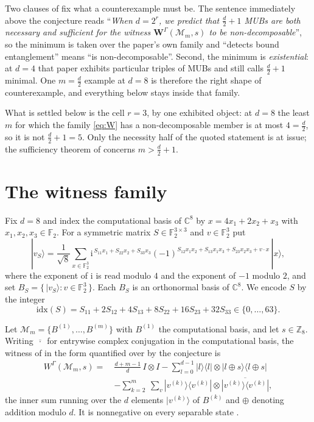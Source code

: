 \documentclass[11pt]{amsart}
\newcommand{\CC}{\mathbb C}
\newcommand{\FF}{\mathbb F_2}
\newcommand{\W}{W^{\Gamma}}
\newcommand{\M}{\mathcal M}
\newcommand{\ii}{\mathrm i}
\begin{document}
Two clauses of \cite{BBCHM} fix what a counterexample must be. The sentence
immediately above the conjecture reads ``\emph{When $d=2^r$, we predict that
$\frac d2+1$ MUBs are both necessary and sufficient for the witness
$\mathbf W^{\Gamma}(\mathcal M_m,s)$ to be non-decomposable}'', so the minimum is taken
over the paper's own family and ``detects bound entanglement'' means ``is
non-decomposable''. Second, the minimum is \emph{existential}: at $d=4$ that paper
exhibits particular triples of MUBs and still calls $\frac d2+1$ minimal. One
$m=\frac d2$ example at $d=8$ is therefore the right shape of counterexample, and
everything below stays inside that family.

What is settled below is the cell $r=3$, by one exhibited object: at $d=8$ the least
$m$ for which the family \eqref{eq:W} has a non-decomposable member is at most
$4=\frac d2$, so it is not $\frac d2+1=5$. Only the necessity half of the quoted
statement is at issue; the sufficiency theorem of \cite{BBCHM} concerns
$m>\frac d2+1$.

\section{The witness family}

Fix $d=8$ and index the computational basis of $\CC^8$ by
$x=4x_1+2x_2+x_3$ with $x_1,x_2,x_3\in\FF$. For a symmetric matrix
$S\in\FF^{3\times3}$ and $v\in\FF^3$ put
\begin{equation}\label{eq:vS}
  |v_S\rangle
  =\frac1{\sqrt8}\sum_{x\in\FF^3}
   \ii^{\,S_{11}x_1+S_{22}x_2+S_{33}x_3}
   (-1)^{S_{12}x_1x_2+S_{13}x_1x_3+S_{23}x_2x_3+v\cdot x}\,|x\rangle ,
\end{equation}
where the exponent of $\ii$ is read modulo $4$ and the exponent of $-1$ modulo $2$,
and set $B_S=\{\,|v_S\rangle : v\in\FF^3\,\}$. Each $B_S$ is an orthonormal basis of
$\CC^8$. We encode $S$ by the integer
\begin{equation}\label{eq:idx}
  \mathrm{idx}(S)=S_{11}+2S_{12}+4S_{13}+8S_{22}+16S_{23}+32S_{33}\in\{0,\dots,63\}.
\end{equation}

Let $\M_m=\{B^{(1)},\dots,B^{(m)}\}$ with $B^{(1)}$ the computational basis, and let
$s\in\mathbb Z_8$. Writing $\overline{\,\cdot\,}$ for entrywise complex conjugation in
the computational basis, the witness of \cite{Spengler} in the form quantified over by
the conjecture is
\begin{equation}\label{eq:W}
\begin{split}
  \W(\M_m,s)
  =\ &\frac{d+m-1}{d}\,I\otimes I
   -\sum_{l=0}^{d-1}|l\rangle\langle l|\otimes|l\oplus s\rangle\langle l\oplus s|\\
   &-\sum_{k=2}^{m}\ \sum_{v}
     |v^{(k)}\rangle\langle v^{(k)}|\otimes
     \overline{|v^{(k)}\rangle\langle v^{(k)}|},
\end{split}
\end{equation}
the inner sum running over the $d$ elements $|v^{(k)}\rangle$ of $B^{(k)}$ and
$\oplus$ denoting addition modulo $d$. It is nonnegative on every
separable state \cite{Spengler}.
\end{document}
